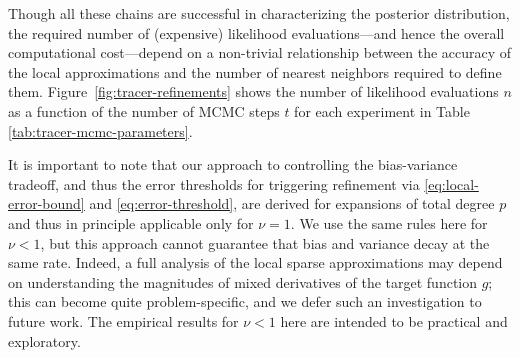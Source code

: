 Though all these chains are successful in characterizing the posterior distribution, the required number of (expensive) likelihood evaluations---and hence the overall computational cost---depend on a non-trivial relationship between the accuracy of the local approximations and the number of nearest neighbors required to define them. 
Figure~\ref{fig:tracer-refinements} shows the number of likelihood evaluations $n$ as a function of the number of MCMC steps $t$ for each experiment in Table \ref{tab:tracer-mcmc-parameters}. 

It is important to note that our approach to controlling the bias-variance tradeoff, and thus the error thresholds for triggering refinement via \eqref{eq:local-error-bound} and \eqref{eq:error-threshold}, are derived for expansions of total degree $p$ and thus in principle applicable only for $\nu=1$. We use the same rules here for $\nu<1$, but this approach cannot guarantee that bias and variance decay at the same rate. Indeed, a full analysis of the local sparse approximations may depend on understanding the magnitudes of mixed derivatives of the target function $g$; this can become quite problem-specific, and we defer such an investigation to future work. The empirical results for $\nu<1$ here are intended to be practical and exploratory.

